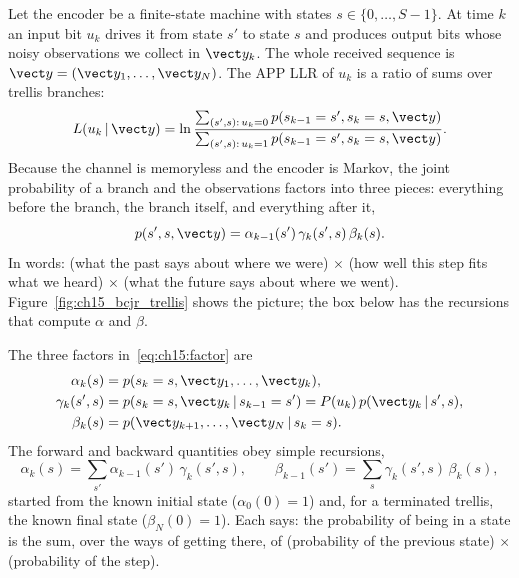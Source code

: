 Let the encoder be a finite-state machine with states $s\in\{0,\dots,S-1\}$. At time $k$ an input
bit $u_k$ drives it from state $s'$ to state $s$ and produces output bits whose noisy observations
we collect in $\vect y_k$. The whole received sequence is $\vect y=(\vect y_1,\dots,\vect y_N)$. The
APP LLR of $u_k$ is a ratio of sums over trellis branches:
\begin{equation}
L(u_k\,|\,\vect y)=\ln\frac{\sum_{(s',s):\,u_k=0}p(s_{k-1}=s',s_k=s,\vect y)}
{\sum_{(s',s):\,u_k=1}p(s_{k-1}=s',s_k=s,\vect y)}.
\label{eq:ch15:app}
\end{equation}
Because the channel is memoryless and the encoder is Markov, the joint probability of a branch and
the observations factors into three pieces: everything before the branch, the branch itself, and
everything after it,
\begin{equation}
p(s',s,\vect y)=\alpha_{k-1}(s')\,\gamma_k(s',s)\,\beta_k(s).
\label{eq:ch15:factor}
\end{equation}
In words: (what the past says about where we were) $\times$ (how well this step fits what we
heard) $\times$ (what the future says about where we went). Figure~\ref{fig:ch15_bcjr_trellis}
shows the picture; the box below has the recursions that compute $\alpha$ and $\beta$.


\begin{deeper}
The three factors in~\eqref{eq:ch15:factor} are
\begin{align}
\alpha_k(s)&=p(s_k=s,\vect y_1,\dots,\vect y_k), \nonumber\\
\gamma_k(s',s)&=p(s_k=s,\vect y_k\,|\,s_{k-1}=s') = P(u_k)\,p(\vect y_k\,|\,s',s), \\
\beta_k(s)&=p(\vect y_{k+1},\dots,\vect y_N\,|\,s_k=s). \nonumber
\end{align}
The forward and backward quantities obey simple recursions,
\begin{equation}
\alpha_k(s)=\sum_{s'}\alpha_{k-1}(s')\,\gamma_k(s',s),\qquad
\beta_{k-1}(s')=\sum_{s}\gamma_k(s',s)\,\beta_k(s),
\label{eq:ch15:recursions}
\end{equation}
started from the known initial state ($\alpha_0(0)=1$) and, for a terminated trellis, the known final
state ($\beta_N(0)=1$). Each says: the probability of being in a state is the sum, over the ways
of getting there, of (probability of the previous state) $\times$ (probability of the step).
\end{deeper}

